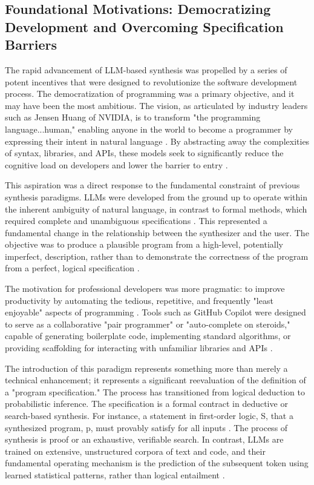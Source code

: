 \documentclass[12pt, a4paper]{report}
\begin{document}
\subsection{Foundational Motivations: Democratizing Development and Overcoming Specification Barriers}

The rapid advancement of LLM-based synthesis was propelled by a series of potent incentives that were designed to revolutionize the software development process.  The democratization of programming was a primary objective, and it may have been the most ambitious.  The vision, as articulated by industry leaders such as Jensen Huang of NVIDIA, is to transform "the programming language...human," enabling anyone in the world to become a programmer by expressing their intent in natural language \citep{huang2023jensen}.  By abstracting away the complexities of syntax, libraries, and APIs, these models seek to significantly reduce the cognitive load on developers and lower the barrier to entry \citep{barker2023automatically}.

 This aspiration was a direct response to the fundamental constraint of previous synthesis paradigms.  LLMs were developed from the ground up to operate within the inherent ambiguity of natural language, in contrast to formal methods, which required complete and unambiguous specifications \citep{gulwani2017program}.  This represented a fundamental change in the relationship between the synthesizer and the user.  The objective was to produce a plausible program from a high-level, potentially imperfect, description, rather than to demonstrate the correctness of the program from a perfect, logical specification \citep{gulwani2017program}.

 The motivation for professional developers was more pragmatic: to improve productivity by automating the tedious, repetitive, and frequently "least enjoyable" aspects of programming \citep{chen2021evaluating}.  Tools such as GitHub Copilot were designed to serve as a collaborative "pair programmer" or "auto-complete on steroids," capable of generating boilerplate code, implementing standard algorithms, or providing scaffolding for interacting with unfamiliar libraries and APIs \citep{gulwani2017program}.

 The introduction of this paradigm represents something more than merely a technical enhancement; it represents a significant reevaluation of the definition of a "program specification."  The process has transitioned from logical deduction to probabilistic inference.  The specification is a formal contract in deductive or search-based synthesis. For instance, a statement in first-order logic, S, that a synthesized program, p, must provably satisfy for all inputs \citep{gulwani2017program}.  The process of synthesis is proof or an exhaustive, verifiable search.  In contrast, LLMs are trained on extensive, unstructured corpora of text and code, and their fundamental operating mechanism is the prediction of the subsequent token using learned statistical patterns, rather than logical entailment \citep{zhao2023survey}.
\end{document}
